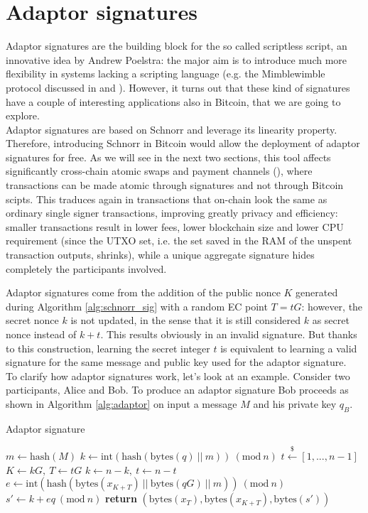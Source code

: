 \section{Adaptor signatures}
\label{adaptor}
Adaptor signatures are the building block for the so called scriptless script, an innovative idea by Andrew Poelstra: the major aim is to introduce much more flexibility in systems lacking a scripting language (e.g. the Mimblewimble protocol discussed in \cite{MW1} and \cite{MW2}). However, it turns out that these kind of signatures have a couple of interesting applications also in Bitcoin, that we are going to explore.
\\
Adaptor signatures are based on Schnorr and leverage its linearity property. Therefore, introducing Schnorr in Bitcoin would allow the deployment of adaptor signatures for free. As we will see in the next two sections, this tool affects significantly cross-chain atomic swaps and payment channels (\cite{RefWork:17}), where transactions can be made atomic through signatures and not through Bitcoin scipts. This traduces again in transactions that on-chain look the same as ordinary single signer transactions, improving greatly privacy and efficiency: smaller transactions result in lower fees, lower blockchain size and lower CPU requirement (since the UTXO set, i.e. the set saved in the RAM of the unspent transaction outputs, shrinks), while a unique aggregate signature hides completely the participants involved.

\bigskip
\noindent
Adaptor signatures come from the addition of the public nonce $K$ generated during Algorithm \ref{alg:schnorr_sig} with a random EC point $T = tG$: however, the secret nonce $k$ is not updated, in the sense that it is still considered $k$ as secret nonce instead of $k + t$. This results obviously in an invalid signature. But thanks to this construction, learning the secret integer $t$ is equivalent to learning a valid signature for the same message and public key used for the adaptor signature.
\\
To clarify how adaptor signatures work, let's look at an example. Consider two participants, Alice and Bob. To produce an adaptor signature Bob proceeds as shown in Algorithm \ref{alg:adaptor} on input a message $M$ and his private key $q_B$.

\begin{algorithm}
	\caption{Adaptor signature}
	\label{alg:adaptor}
	\begin{algorithmic}[1]
		\State $m \gets \text{hash}(M)$
		\State $k \gets \text{int}(\text{hash}(\text{bytes}(q) \ || \ m)) \ (\text{mod} \ n)$
		\State $t \xleftarrow{\text{\$}} [1, ..., n - 1]$
		\State $K \gets kG, \ T \gets tG$
		\State $k \gets n - k, \ t \gets n - t$
		\EndIf
		\State $e \gets \text{int}(\text{hash}(\text{bytes}(x_{K + T}) \ || \ \text{bytes}(qG) \ || \ m)) \ (\text{mod} \ n)$
		\State $s' \gets k + eq \ (\text{mod} \ n)$
		\State \textbf{return} $(\text{bytes}(x_T), \text{bytes}(x_{K + T}), \text{bytes}(s'))$
		\EndProcedure
	\end{algorithmic}
\end{algorithm}

